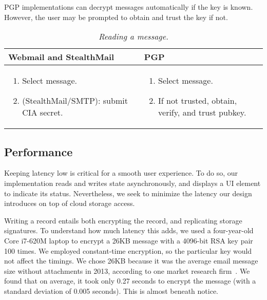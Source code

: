 PGP implementations can decrypt messages automatically if the key is known.  However, the user may be prompted to obtain and trust the key if not.

\begin{table}[ht!]
\begin{tabular}{ | L{3.5cm} | L{3.5cm} |}
\hline
\textbf{Webmail and StealthMail} & \textbf{PGP} \\
\hline
\vspace{-3mm}
\begin{enumerate}
  \item{Select message.}
  \item{(StealthMail/SMTP): submit CIA secret.}
\end{enumerate}
\vspace{-3mm}
 &

\vspace{-3mm}
\begin{enumerate}
  \item{Select message.}
  \item{If not trusted, obtain, verify, and trust pubkey.}
\end{enumerate} 
\vspace{-\topsep} \\

\hline
\end{tabular}
\caption{\it Reading a message.}
\label{tab:account-creation}
\end{table}

\subsection{Performance}

Keeping latency low is critical for a smooth user experience.  To do so, our implementation reads and writes state asynchronously, and displays a UI element to indicate its status.  Nevertheless, we seek to minimize the latency our design introduces on top of cloud storage access.

Writing a record entails both encrypting the record, and replicating storage signatures.  To understand how much latency this adds, we used a four-year-old Core i7-620M laptop to encrypt a 26KB message with a 4096-bit RSA key pair 100 times.  We employed constant-time encryption, so the particular key would not affect the timings.  We chose 26KB because it was the average email message size without attachments in 2013, according to one market research firm~\cite{email-statistics-report}.  We found that on average, it took only 0.27 seconds to encrypt the message (with a standard deviation of 0.005 seconds).  This is almost beneath notice.

